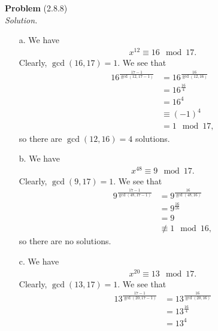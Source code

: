 \documentclass[12 pt]{amsart}
\begin{document}
\noindent
\textbf{Problem} (2.8.8) \\[4ex]
\emph{Solution.} \\[2ex]
	\begin{enumerate}
		\item[a.]
      We have
      \begin{align*}
        x^{12} \equiv 16 \mod 17.
      \end{align*}
      Clearly, $\gcd(16, 17) = 1$. 
      We see that 
      \begin{align*}
        16^{\frac{17-1}{\gcd(12, 17-1)}} &= 16^{\frac{16}{\gcd(12, 16)}} \\
                                         &= 16^{\frac{16}{4}} \\
                                         &= 16^4 \\
                                         &\equiv (-1)^4 \\
                                         &= 1 \mod 17,
      \end{align*}
      so there are $\gcd(12, 16) = 4$ solutions. 
		\item[b.]
      We have
      \begin{align*}
        x^{48} \equiv 9 \mod 17.
      \end{align*}
      Clearly, $\gcd(9, 17) = 1$. 
      We see that 
      \begin{align*}
        9^{\frac{17-1}{\gcd(48, 17-1)}} &= 9^{\frac{16}{\gcd(48, 16)}} \\
                                         &= 9^{\frac{16}{16}} \\
                                         &= 9 \\
                                         &\not \equiv 1 \mod 16,
      \end{align*}
      so there are no solutions.
		\item[c.]
      We have
      \begin{align*}
        x^{20} \equiv 13 \mod 17.
      \end{align*}
      Clearly, $\gcd(13, 17) = 1$. 
      We see that 
      \begin{align*}
        13^{\frac{17-1}{\gcd(20, 17-1)}} &= 13^{\frac{16}{\gcd(20, 16)}} \\
                                         &= 13^{\frac{16}{4}} \\
                                         &= 13^{4} \\

\end{align*}
\end{enumerate}
\end{document}
